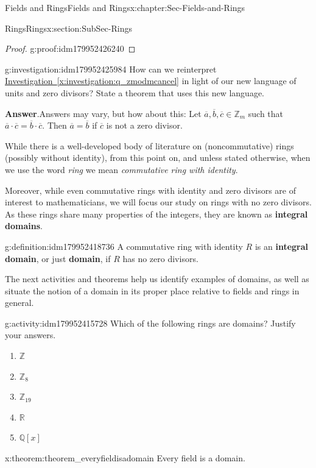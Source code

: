 \documentclass[oneside,10pt,]{book}
\newcommand{\blocktitlefont}{\relax}
\newcommand{\xreffont}{\relax}
\newcommand{\terminology}[1]{\textbf{#1}}
\numberwithin{equation}{section}
\def\Z{{\mathbb Z}}
\def\Q{{\mathbb Q}}
\def\R{{\mathbb R}}
\begin{document}
\begin{chapterptx}{Fields and Rings}{}{Fields and Rings}{}{}{x:chapter:Sec-Fields-and-Rings}
\begin{sectionptx}{Rings}{}{Rings}{}{}{x:section:SubSec-Rings}
\begin{proof}{}{g:proof:idm179952426240}
\end{proof}
\begin{investigation}{}{g:investigation:idm179952425984}%
How can we reinterpret \hyperref[x:investigation:q_zmodmcancel]{Investigation~{\xreffont\ref{x:investigation:q_zmodmcancel}}} in light of our new language of units and zero divisors? State a theorem that uses this new language.%
\par\smallskip%
\noindent\textbf{\blocktitlefont Answer}.\hypertarget{g:answer:idm179952422800}{}\quad{}Answers may vary, but how about this: Let \(\overline{a},\overline{b},\overline{c}\in \Z_m\) such that \(\overline{a}\cdot \overline{c} = \overline{b}\cdot \overline{c}\). Then \(\overline{a} = \overline{b}\) if \(\overline{c}\) is not a zero divisor.%
\end{investigation}
While there is a well-developed body of literature on (noncommutative) rings (possibly without identity), from this point on, and unless stated otherwise, when we use the word \emph{ring} we mean \emph{commutative ring with identity}.%
\par
Moreover, while even commutative rings with identity and zero divisors are of interest to mathematicians, we will focus our study on rings with no zero divisors. As these rings share many properties of the integers, they are known as \terminology{integral domains}.%
\begin{definition}{}{g:definition:idm179952418736}%
%
%
A commutative ring with identity \(R\) is an \terminology{integral domain}, or just \terminology{domain}, if \(R\) has no zero divisors.%
\end{definition}
The next activities and theorems help us identify examples of domains, as well as situate the notion of a domain in its proper place relative to fields and rings in general.%
\begin{activity}{}{g:activity:idm179952415728}%
Which of the following rings are domains? Justify your answers.%
\begin{enumerate}
\item{}\(\Z\)%
\item{}\(\Z_{8}\)%
\item{}\(\Z_{19}\)%
\item{}\(\R\)%
\item{}\(\Q[x]\)%
\end{enumerate}
%
\end{activity}
\begin{theorem}{}{}{x:theorem:theorem_everyfieldisadomain}%
Every field is a domain.%

\end{theorem}
\end{sectionptx}
\end{chapterptx}
\end{document}
